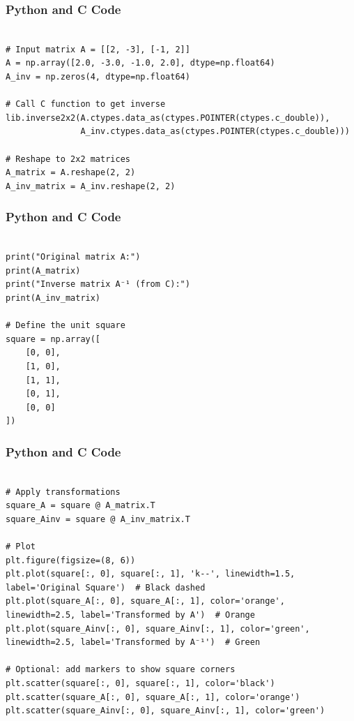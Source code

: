 \documentclass{beamer}
\begin{document}
\begin{frame}[fragile]
\frametitle{Python and C Code}

\begin{lstlisting}

# Input matrix A = [[2, -3], [-1, 2]]
A = np.array([2.0, -3.0, -1.0, 2.0], dtype=np.float64)
A_inv = np.zeros(4, dtype=np.float64)

# Call C function to get inverse
lib.inverse2x2(A.ctypes.data_as(ctypes.POINTER(ctypes.c_double)),
               A_inv.ctypes.data_as(ctypes.POINTER(ctypes.c_double)))

# Reshape to 2x2 matrices
A_matrix = A.reshape(2, 2)
A_inv_matrix = A_inv.reshape(2, 2)
  \end{lstlisting}
\end{frame}

\begin{frame}[fragile]
\frametitle{Python and C Code}

\begin{lstlisting}

print("Original matrix A:")
print(A_matrix)
print("Inverse matrix A⁻¹ (from C):")
print(A_inv_matrix)

# Define the unit square
square = np.array([
    [0, 0],
    [1, 0],
    [1, 1],
    [0, 1],
    [0, 0]
])
  \end{lstlisting}
\end{frame}

\begin{frame}[fragile]
\frametitle{Python and C Code}

\begin{lstlisting}

# Apply transformations
square_A = square @ A_matrix.T
square_Ainv = square @ A_inv_matrix.T

# Plot
plt.figure(figsize=(8, 6))
plt.plot(square[:, 0], square[:, 1], 'k--', linewidth=1.5, label='Original Square')  # Black dashed
plt.plot(square_A[:, 0], square_A[:, 1], color='orange', linewidth=2.5, label='Transformed by A')  # Orange
plt.plot(square_Ainv[:, 0], square_Ainv[:, 1], color='green', linewidth=2.5, label='Transformed by A⁻¹')  # Green

# Optional: add markers to show square corners
plt.scatter(square[:, 0], square[:, 1], color='black')
plt.scatter(square_A[:, 0], square_A[:, 1], color='orange')
plt.scatter(square_Ainv[:, 0], square_Ainv[:, 1], color='green')
  \end{lstlisting}
\end{frame}
\end{document}
